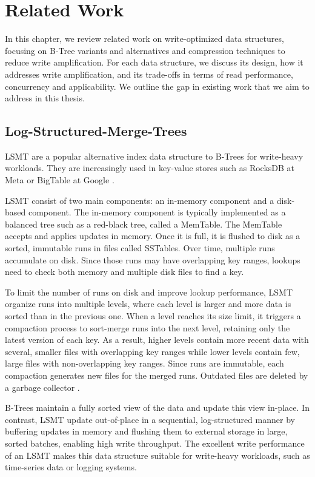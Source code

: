 \chapter{Related Work}
In this chapter, we review related work on write-optimized data structures, focusing on B-Tree variants and alternatives and compression techniques to reduce write amplification.
For each data structure, we discuss its design, how it addresses write amplification, and its trade-offs in terms of read performance, concurrency and applicability.
We outline the gap in existing work that we aim to address in this thesis.

\section{Log-Structured-Merge-Trees}
\ac{LSMT} \cite{oneil1996log} are a popular alternative index data structure to B-Trees for write-heavy workloads.
They are increasingly used in key-value stores such as RocksDB at Meta \cite{rocksdb} or BigTable at Google \cite{chang2008bigtable}.

\ac{LSMT} consist of two main components: an in-memory component and a disk-based component.
The in-memory component is typically implemented as a balanced tree such as a red-black tree, called a MemTable.
The MemTable accepts and applies updates in memory.
Once it is full, it is flushed to disk as a sorted, immutable runs in files called SSTables.
Over time, multiple runs accumulate on disk.
Since those runs may have overlapping key ranges, lookups need to check both memory and multiple disk files to find a key.

To limit the number of runs on disk and improve lookup performance, \ac{LSMT} organize runs into multiple levels, where each level is larger and more data is sorted than in the previous one.
When a level reaches its size limit, it triggers a compaction process to sort-merge runs into the next level, retaining only the latest version of each key.
As a result, higher levels contain more recent data with several, smaller files with overlapping key ranges while lower levels contain few, large files with non-overlapping key ranges.
Since runs are immutable, each compaction generates new files for the merged runs.
Outdated files are deleted by a garbage collector \cite{sarkar2022lsmt}.


B-Trees maintain a fully sorted view of the data and update this view in-place.
In contrast, \ac{LSMT} update out-of-place in a sequential, log-structured manner by buffering updates in memory and flushing them to external storage in large, sorted batches, enabling high write throughput.
The excellent write performance of an \ac{LSMT} makes this data structure suitable for write-heavy workloads, such as time-series data or logging systems.

